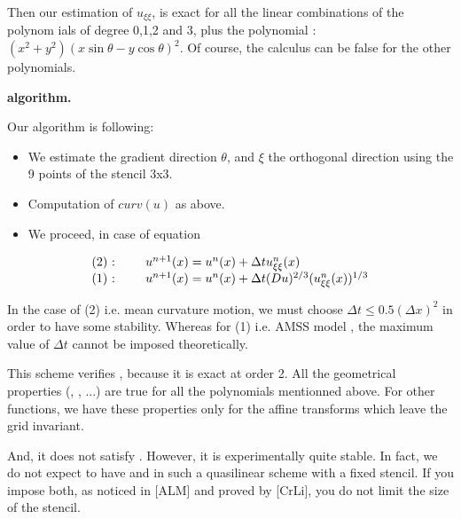 Then our estimation of $u_{\xi\xi}$, is exact for all the linear combinations of the polynom
ials
 of degree 0,1,2 and 3, plus the polynomial :$(x^2+y^2)(x \sin\theta - y \cos\theta ) ^2$. 
Of course, the calculus can be false for the other polynomials.

{\bf algorithm.}


  Our algorithm is following:


\begin {itemize}

\item We estimate the gradient direction $\theta$, and $\xi$ the orthogonal direction
using the 9 points of the stencil 3x3.

\item Computation of $curv(u)$ as above.

\item We proceed, in case of equation

\end {itemize}

$$ \begin{array}{l} \hbox{(2) : } \qquad u^{n+1}(x) = u^{n}(x) + \Delta t u^n_{\xi\xi}(x)
\\ \hbox{(1) : } \qquad u^{n+1}(x) =u^{n}(x) +
 \Delta t (Du)^{2/3} (u^n_{\xi\xi}(x))^{1/3} \end{array} $$

In the case of (2) i.e. mean curvature motion, we must choose $\Delta t \leq 0.5 (\Delta x)^2$
 in order to have some stability.
Whereas for (1) i.e. AMSS model , the maximum value of $\Delta t$ cannot be imposed
theoretically.


This scheme verifies \CONS, because it is exact at order 2.
All the geometrical properties (\ROTA, \ECHE, ...) are true for
all the polynomials mentionned above. For other functions, we have these properties only
 for the affine transforms which leave the grid invariant.

And, it does not satisfy \MONO. However, it is experimentally
quite stable.
In fact, we do not expect to have \MONO and \CONS in such a quasilinear scheme
with a fixed stencil. If you impose both, as noticed in [ALM] and proved 
by [CrLi], you do not limit the size of the stencil.
 

